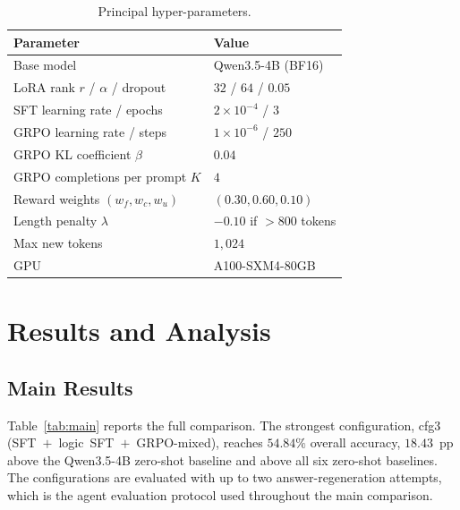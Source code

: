 \documentclass[preprint,12pt]{elsarticle}
\newcommand{\basemodelname}{Qwen3.5-4B}
\begin{document}
\begin{table}[t]
\centering
\caption{Principal hyper-parameters.}
\label{tab:hyperparams}
\begin{tabular}{ll}
\toprule
Parameter & Value \\
\midrule
Base model & \basemodelname{} (BF16) \\
LoRA rank $r$ / $\alpha$ / dropout & $32$ / $64$ / $0.05$ \\
SFT learning rate / epochs & $2\times10^{-4}$ / $3$ \\
GRPO learning rate / steps & $1\times10^{-6}$ / $250$ \\
GRPO KL coefficient $\beta$ & $0.04$ \\
GRPO completions per prompt $K$ & $4$ \\
Reward weights $(w_f,w_c,w_u)$ & $(0.30,0.60,0.10)$ \\
Length penalty $\lambda$ & $-0.10$ if ${>}800$ tokens \\
Max new tokens & $1{,}024$ \\
GPU & A100-SXM4-80GB \\
\bottomrule
\end{tabular}
\end{table}

\section{Results and Analysis}
\label{sec:results}

\subsection{Main Results}
Table~\ref{tab:main} reports the full comparison. The strongest
configuration, cfg3 (SFT~$+$~logic~SFT~$+$~GRPO-mixed), reaches $54.84\%$
overall accuracy, $18.43$~pp above the \basemodelname{} zero-shot baseline
and above all six zero-shot baselines. The configurations are evaluated
with up to two answer-regeneration attempts, which is the agent evaluation
protocol used throughout the main comparison.
\end{document}
